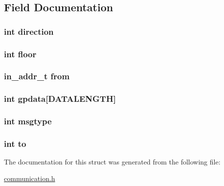 \subsection{Field Documentation}
\hypertarget{structmsg_a886d551d5381dc3e53f17825ffc51641}{
\subsubsection[{direction}]{\setlength{\rightskip}{0pt plus 5cm}int direction}}\label{structmsg_a886d551d5381dc3e53f17825ffc51641}
\hypertarget{structmsg_aae85c3a510bb6ec64e3569ede2518893}{
\subsubsection[{floor}]{\setlength{\rightskip}{0pt plus 5cm}int floor}}\label{structmsg_aae85c3a510bb6ec64e3569ede2518893}
\hypertarget{structmsg_a57b66f80e7f8c73e669ea67813cd3e95}{
\subsubsection[{from}]{\setlength{\rightskip}{0pt plus 5cm}in\-\_\-addr\-\_\-t from}}\label{structmsg_a57b66f80e7f8c73e669ea67813cd3e95}
\hypertarget{structmsg_af06efcb2e3d6af562c283ed986ba246f}{
\subsubsection[{gpdata}]{\setlength{\rightskip}{0pt plus 5cm}int gpdata\mbox{[}{\bf D\-A\-T\-A\-L\-E\-N\-G\-T\-H}\mbox{]}}}\label{structmsg_af06efcb2e3d6af562c283ed986ba246f}
\hypertarget{structmsg_ad976f3a497337466495d05d9d0adaae6}{
\subsubsection[{msgtype}]{\setlength{\rightskip}{0pt plus 5cm}int msgtype}}\label{structmsg_ad976f3a497337466495d05d9d0adaae6}
\hypertarget{structmsg_ac0ed249f3db34b8135fd2717bda56844}{
\subsubsection[{to}]{\setlength{\rightskip}{0pt plus 5cm}int to}}\label{structmsg_ac0ed249f3db34b8135fd2717bda56844}


The documentation for this struct was generated from the following file\-:\begin{DoxyCompactItemize}
\item 
\hyperlink{communication_8h}{communication.\-h}\end{DoxyCompactItemize}
